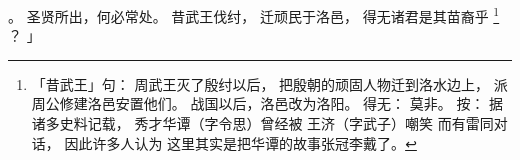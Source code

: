     。
    圣贤所出，何必常处。
    昔武王伐纣，
    迁顽民于洛邑，
    得无诸君是其苗裔乎%
    \footnote{%
        「昔武王」句：
            周武王灭了殷纣以后，
            把殷朝的顽固人物迁到洛水边上，
            派周公修建洛邑安置他们。
            战国以后，洛邑改为洛阳。
        得无：
            莫非。
        按：
            据诸多史料记载，
            秀才华谭（字令思）曾经被
            王济（字武子）嘲笑
            而有雷同对话，
            因此许多人认为
            这里其实是把华谭的故事张冠李戴了。
    }%
    ？
」

\switchcolumn



